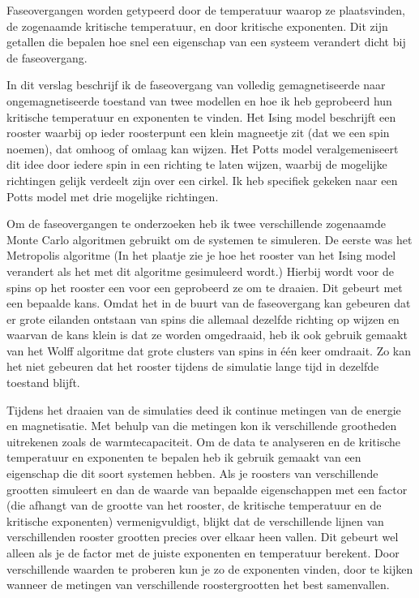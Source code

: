 \documentclass[11pt, a4paper]{report} %
\begin{document}
Faseovergangen worden getypeerd door de temperatuur waarop ze plaatsvinden, de zogenaamde kritische temperatuur, en door kritische exponenten.
Dit zijn getallen die bepalen hoe snel een eigenschap van een systeem verandert dicht bij de faseovergang.

In dit verslag beschrijf ik de faseovergang van volledig gemagnetiseerde naar ongemagnetiseerde toestand van twee modellen en hoe ik heb geprobeerd hun kritische temperatuur en exponenten te vinden.
Het Ising model beschrijft een rooster waarbij op ieder roosterpunt een klein magneetje zit (dat we een spin noemen), dat omhoog of omlaag kan wijzen.
Het Potts model veralgemeniseert dit idee door iedere spin in een richting te laten wijzen, waarbij de mogelijke richtingen gelijk verdeelt zijn over een cirkel.
Ik heb specifiek gekeken naar een Potts model met drie mogelijke richtingen.

Om de faseovergangen te onderzoeken heb ik twee verschillende zogenaamde Monte Carlo algoritmen gebruikt om de systemen te simuleren.
De eerste was het Metropolis algoritme (In het plaatje zie je hoe het rooster van het Ising model verandert als het met dit algoritme gesimuleerd wordt.)
Hierbij wordt voor de spins op het rooster een voor een geprobeerd ze om te draaien. Dit gebeurt met een bepaalde kans.
Omdat het in de buurt van de faseovergang kan gebeuren dat er grote eilanden ontstaan van spins die allemaal dezelfde richting op wijzen en waarvan de kans klein is dat ze worden omgedraaid, heb ik ook gebruik gemaakt van het Wolff algoritme dat grote clusters van spins in één keer omdraait.
Zo kan het niet gebeuren dat het rooster tijdens de simulatie lange tijd in dezelfde toestand blijft.

Tijdens het draaien van de simulaties deed ik continue metingen van de energie en magnetisatie.
Met behulp van die metingen kon ik verschillende grootheden uitrekenen zoals de warmtecapaciteit.
Om de data te analyseren en de kritische temperatuur en exponenten te bepalen heb ik gebruik gemaakt van een eigenschap die dit soort systemen hebben.
Als je roosters van verschillende grootten simuleert en dan de waarde van bepaalde eigenschappen met een factor (die afhangt van de grootte van het rooster, de kritische temperatuur en de kritische exponenten) vermenigvuldigt, blijkt dat de verschillende lijnen van verschillenden rooster grootten precies over elkaar heen vallen.
Dit gebeurt wel alleen als je de factor met de juiste exponenten en temperatuur berekent.
Door verschillende waarden te proberen kun je zo de exponenten vinden, door te kijken wanneer de metingen van verschillende roostergrootten het best samenvallen.
\end{document}
